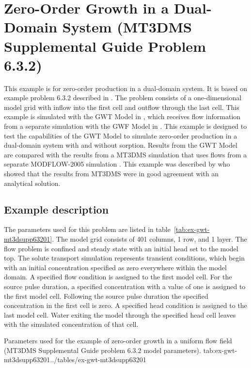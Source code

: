 \section{Zero-Order Growth in a Dual-Domain System (MT3DMS Supplemental Guide Problem 6.3.2)}

This example is for zero-order production in a dual-domain system.  It is based on example problem 6.3.2 described in \cite{zheng2010mt3dmsv5.3}.  The problem consists of a one-dimensional model grid with inflow into the first cell and outflow through the last cell.  This example is simulated with the GWT Model in \mf, which receives flow information from a separate simulation with the GWF Model in \mf.  This example is designed to test the capabilities of the GWT Model to simulate zero-order production in a dual-domain system with and without sorption.  Results from the GWT Model are compared with the results from a MT3DMS simulation \citep{zheng1990mt3d} that uses flows from a separate MODFLOW-2005 simulation \citep{modflow2005}.  This example was described by \cite{zheng2010mt3dmsv5.3} who showed that the results from MT3DMS were in good agreement with an analytical solution.

\subsection{Example description}

The parameters used for this problem are listed in table~\ref{tab:ex-gwt-mt3dsupp63201}.  The model grid consists of 401 columns, 1 row, and 1 layer.  The flow problem is confined and steady state with an initial head set to the model top.  The solute transport simulation represents transient conditions, which begin with an initial concentration specified as zero everywhere within the model domain.  A specified flow condition is assigned to the first model cell.  For the source pulse duration, a specified concentration with a value of one is assigned to the first model cell.  Following the source pulse duration the specified concentration in the first cell is zero.  A specified head condition is assigned to the last model cell.  Water exiting the model through the specified head cell leaves with the simulated concentration of that cell.

\begin{StandardTable}{Parameters used for the example of zero-order growth in a uniform flow field (MT3DMS Supplemental Guide problem 6.3.2 model parameters).
}{tab:ex-gwt-mt3dsupp63201}{../tables/ex-gwt-mt3dsupp63201}
\end{StandardTable}

